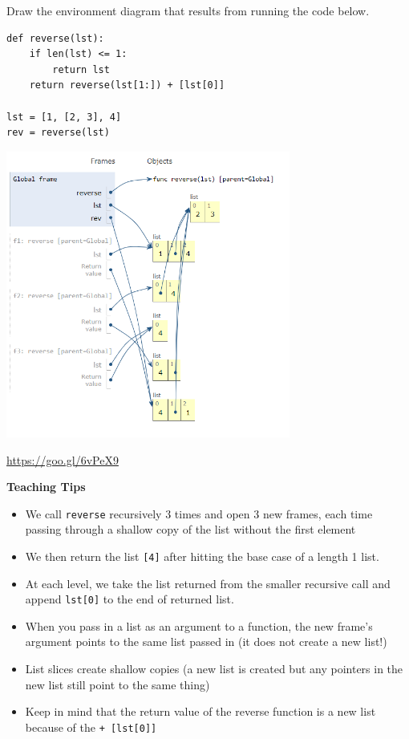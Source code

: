 \begin{blocksection}
\question Draw the environment diagram that results from running the code below.

\begin{lstlisting}
def reverse(lst):
    if len(lst) <= 1:
        return lst
    return reverse(lst[1:]) + [lst[0]]

lst = [1, [2, 3], 4]
rev = reverse(lst)
\end{lstlisting}

\begin{solution}[2in]
\includegraphics[width=0.7\textwidth]{reverse.png}

\url{https://goo.gl/6vPeX9}
\end{solution}
\end{blocksection}

\begin{questionmeta}
\textbf{Teaching Tips}
\begin{itemize}
    \item We call \lstinline{reverse} recursively 3 times and open 3 new frames, each time passing through a shallow copy of the list without the first element
    \item We then return the list \lstinline{[4]} after hitting the base case of a length 1 list.
    \item At each level, we take the list returned from the smaller recursive call and append \lstinline{lst[0]} to the end of returned list.
    \item When you pass in a list as an argument to a function, the new frame’s argument points to the same list passed in (it does not create a new list!)
    \item List slices create shallow copies (a new list is created but any pointers in the new list still point to the same thing)
    \item Keep in mind that the return value of the reverse function is a new list because of the \lstinline{+ [lst[0]]}
\end{itemize}
\end{questionmeta}
